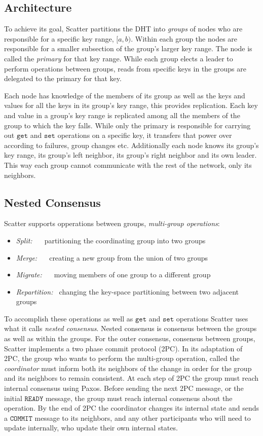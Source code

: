 \documentclass{amsart}
\theoremstyle{definition}
\theoremstyle{remark}
\numberwithin{equation}{section}
\begin{document}
\subsection{Architecture}
To achieve its goal, Scatter partitions the DHT into \textit{groups} of nodes who are responsible for a specific key range, $[a,b)$. Within each group the nodes are responsible for a smaller subsection of the group's larger key range. The node is called the \textit{primary} for that key range. While each group elects a leader to perform operations between groups, reads from specific keys in the groups are delegated to the primary for that key.

Each node has knowledge of the members of its group as well as the keys and values for all the keys in its group's key range, this provides replication. Each key and value in a group's key range is replicated among all the members of the group to which the key falls. While only the primary is responsible for carrying out $\mathtt{get}$ and $\mathtt{set}$ operations on a specific key, it transfers that power over according to failures, group changes etc.  Additionally each node knows its group's key range, its group's left neighbor, its group's right neighbor and its own leader. This way each group cannot communicate with the rest of the network, only its neighbors.

\subsection{Nested Consensus}
Scatter supports opperations between groups, \textit{multi-group operations}:
\begin{itemize}
\item \textit{Split: \ \ } partitioning the coordinating group into two groups
\item \textit{Merge: \ \ } creating a new group from the union of two groups
\item \textit{Migrate: \ \ } moving members of one group to a different group
\item \textit{Repartition: \ }changing the key-space partitioning between two adjacent groups
\end{itemize}
To accomplish these operations as well as $\mathtt{get}$ and $\mathtt{set}$ operations Scatter uses what it calls \textit{nested consensus}. Nested consensus is consensus between the groups as well as within the groups. For the outer consensus, consensus between groups, Scatter implements a two phase commit protocol (2PC). In its adaptation of 2PC, the group who wants to perform the multi-group operation, called the \textit{coordinator} must inform both its neighbors of the change in order for the group and its neighbors to remain consistent. At each step of 2PC the group must reach internal consensus using Paxos. Before sending the next 2PC message, or the initial $\mathtt{READY}$ message, the group must reach internal consensus about the operation. By the end of 2PC the coordinator changes its internal state and sends a $\mathtt{COMMIT}$ message to its neighbors, and any other participants who will need to update internally, who update their own internal states. 
\end{document}
